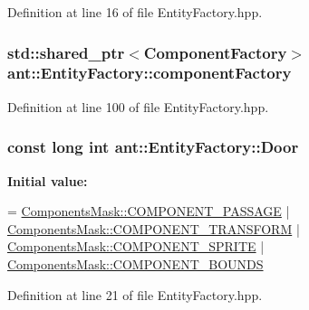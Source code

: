 Definition at line 16 of file Entity\+Factory.\+hpp.

\hypertarget{classant_1_1_entity_factory_ae71b738c0a40e8d70b7b97077687dc42}{
\subsubsection[{component\+Factory}]{\setlength{\rightskip}{0pt plus 5cm}std\+::shared\+\_\+ptr$<${\bf Component\+Factory}$>$ ant\+::\+Entity\+Factory\+::component\+Factory\hspace{0.3cm}{\ttfamily [private]}}}\label{classant_1_1_entity_factory_ae71b738c0a40e8d70b7b97077687dc42}


Definition at line 100 of file Entity\+Factory.\+hpp.

\hypertarget{classant_1_1_entity_factory_a70d75e92457179951ac177df4814467e}{
\subsubsection[{Door}]{\setlength{\rightskip}{0pt plus 5cm}const long int ant\+::\+Entity\+Factory\+::\+Door\hspace{0.3cm}{\ttfamily [static]}}}\label{classant_1_1_entity_factory_a70d75e92457179951ac177df4814467e}
{\bfseries Initial value\+:}
\begin{DoxyCode}
= \hyperlink{class_components_mask_a9686a00bbefcd13f5fab9780446733c1}{ComponentsMask::COMPONENT\_PASSAGE}
                                | \hyperlink{class_components_mask_a3a66579e45c351c13abe63e61f2eaa0a}{ComponentsMask::COMPONENT\_TRANSFORM}
                                | \hyperlink{class_components_mask_ab05302f9381801724a58273ff83ad2a6}{ComponentsMask::COMPONENT\_SPRITE}
                                | \hyperlink{class_components_mask_a81ccaf0bf7344c970bc8474df2625ba7}{ComponentsMask::COMPONENT\_BOUNDS}
\end{DoxyCode}


Definition at line 21 of file Entity\+Factory.\+hpp.

